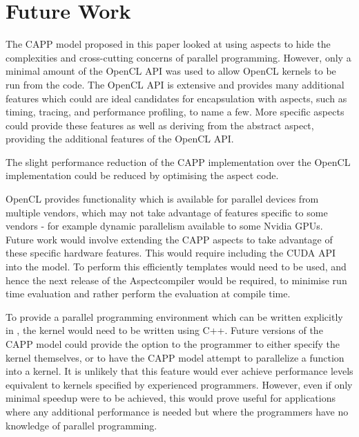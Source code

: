 \documentclass{sig-alternate-05-2015}
\begin{document}
\section{Future Work}\label{sec:future}

The CAPP model proposed in this paper looked at using aspects to hide
the complexities and cross-cutting concerns of parallel programming. However, only a
minimal amount of the OpenCL API was used to allow OpenCL kernels to be run from the
\CPP code. The OpenCL API is extensive and provides many additional features which 
could are ideal candidates for encapsulation with aspects, such as timing,
tracing, and performance profiling, to name a few. More specific aspects could
provide these features as well as deriving from the abstract aspect, providing
the additional features of the OpenCL API.

The slight performance reduction of the CAPP implementation over the
OpenCL implementation could be reduced by optimising the aspect code.

OpenCL provides functionality which is available for parallel devices from
multiple vendors, which may not take advantage of features specific to some
vendors - for example dynamic parallelism available to some Nvidia GPUs.
Future work would involve extending the CAPP aspects to take advantage
of these specific hardware features. This would require including the CUDA API
into the model. To perform this efficiently templates would need to be used, and
hence the next release of the Aspect\CPP compiler would be required, to
minimise run time evaluation and rather perform the evaluation at compile time.

To provide a parallel programming environment which can be written explicitly in
\CPP, the kernel would need to be written using C++. Future versions of the
CAPP model could provide the option to the programmer to either specify
the kernel themselves, or to have the CAPP model attempt to
parallelize a \CPP function into a kernel. It is unlikely that this feature would
ever achieve performance levels equivalent to kernels specified by experienced
programmers. However, even if only minimal speedup were to be achieved, this would prove 
useful for applications where any additional performance is needed but where the
programmers have no knowledge of parallel programming. 

%

%
%
\end{document}
